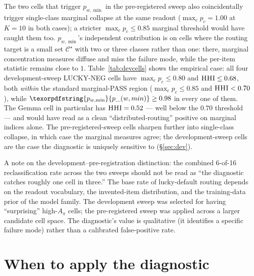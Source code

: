 \documentclass[11pt,letterpaper]{article}
\newcommand{\pwmin}{\texorpdfstring{\ensuremath{p_{w,\min}}}{p\_(w,min)}}
\newcommand{\hhi}{\textsc{HHI}}
\begin{document}
The two cells that trigger \pwmin{} in the pre-registered sweep
also coincidentally trigger single-class marginal collapse at the
same readout ($\max_c p_c = 1.00$ at $K = 10$ in both cases);
a stricter $\max_c p_c \leq 0.85$ marginal threshold would have
caught them too. \pwmin{}'s independent contribution is on cells
where the routing target is a small set $\mathcal{C}^\star$ with
two or three classes rather than one: there, marginal concentration
measures diffuse and miss the failure mode, while the per-item
statistic remains close to $1$. Table~\ref{tab:devcells} shows the
empirical case: all four development-sweep LUCKY-NEG cells have
$\max_c p_c \leq 0.80$ and $\hhi \leq 0.68$, both \emph{within} the
standard marginal-PASS region ($\max_c p_c \leq 0.85$ and
$\hhi < 0.70$), while $\pwmin \geq 0.98$ in every one of them. The
Gemma cell in particular has $\hhi = 0.52$ --- well below the
$0.70$ threshold --- and would have read as a clean
``distributed-routing'' positive on marginal indices alone. The
pre-registered-sweep cells sharpen further into single-class
collapse, in which case the marginal measures agree; the
development-sweep cells are the case the diagnostic is uniquely
sensitive to (\S\ref{sec:dev}).

A note on the development--pre-registration distinction: the
combined 6-of-16 reclassification rate across the two sweeps should
not be read as ``the diagnostic catches roughly one cell in three.''
The base rate of lucky-default routing depends on the readout
vocabulary, the invented-item distribution, and the training-data
prior of the model family. The development sweep was selected for
having ``surprising'' high-$A_\pi$ cells; the pre-registered sweep
was applied across a larger candidate cell space. The diagnostic's
value is qualitative (it identifies a specific failure mode) rather
than a calibrated false-positive rate.

\section{When to apply the diagnostic}
\label{sec:applywhen}
\end{document}
